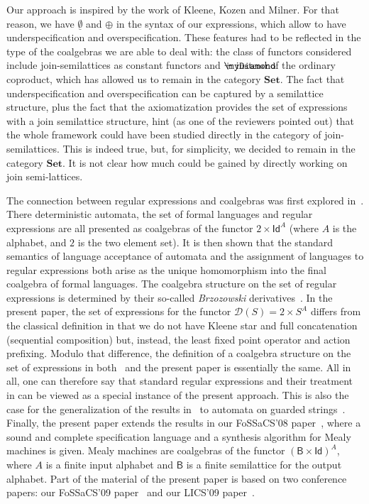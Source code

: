 \documentclass{LMCS}
\newcommand\D{\mathcal{D}}
\newcommand\id{\mathsf{Id}}
\newcommand\B{\mathsf{B}}
\newcommand\emp{\underline\emptyset}
\newcommand{\myplus}{\mathbin{\rlap{$\myDiamond$}\hspace*{.01cm}\raisebox{.14ex}{$+$}}}
\theoremstyle{definition}
\theoremstyle{plain}
\theoremstyle{plain}
\theoremstyle{plain}
\theoremstyle{plain}
\theoremstyle{definition}
\theoremstyle{definition}
\begin{document}
Our approach is inspired by the work of Kleene, Kozen and Milner. For that
reason, we have $\emp$ and $\oplus$ in the syntax of our
expressions, which allow to have underspecification and
overspecification. These features had to be reflected in the type of
the coalgebras we are able to deal with: the class of functors
considered include join-semilattices as constant functors and
$\myplus$ instead of the ordinary coproduct, which has allowed us to
remain in the category $\mathbf{Set}$. The fact that underspecification and
overspecification can be captured by a semilattice structure, plus the
fact that the axiomatization provides the set of expressions with a
join semilattice structure, hint (as one of the reviewers pointed out)
that the whole framework could have been studied directly in the
category of join-semilattices. This is indeed true, but, for
simplicity, we decided to remain in the category $\mathbf{Set}$. It is
not clear how much could be gained by directly working on join
semi-lattices. 

The connection between regular expressions and coalgebras was first
explored in~\cite{Rut98c}. There deterministic  automata, the set of formal languages
and regular expressions are all presented as coalgebras of the
functor $2 \times \id^A$ (where $A$ is the alphabet, and $2$ is the
two element set). It is then shown that the standard semantics of
language acceptance of automata and the assignment of languages to
regular expressions both arise as the unique homomorphism into the
final coalgebra of formal languages. The coalgebra structure on the
set of regular expressions is determined by their so-called {\em
Brzozowski} derivatives~\cite{Brz64}. In the present paper, the set
of expressions for the functor $\D(S) = 2 \times S^A$ differs from
the classical definition in that we do not have Kleene star and full
concatenation (sequential composition) but, instead, the least fixed
point operator and action prefixing. Modulo that difference, the
definition of a coalgebra structure on the set of expressions in
both~\cite{Rut98c} and the present paper is essentially the same.
All in all, one can therefore say that standard regular expressions
and their treatment in \cite{Rut98c} can be viewed as a special
instance of the present approach. This is also the case for the
generalization of the results in~\cite{Rut98c} to automata on guarded
strings~\cite{kozen08}. Finally, the present paper extends the results
in our FoSSaCS'08 paper~\cite{BRS08},
where a sound and complete specification language and a synthesis
algorithm for Mealy machines is given. Mealy machines are coalgebras
of the functor $(\B \times \id)^A$, where $A$ is a finite input
alphabet and $\B$ is a finite semilattice for the output alphabet. Part of the material of the present paper is based on two conference papers: our FoSSaCS'09 paper~\cite{regexp} and our LICS'09 paper~\cite{BRS09b}.
\end{document}
